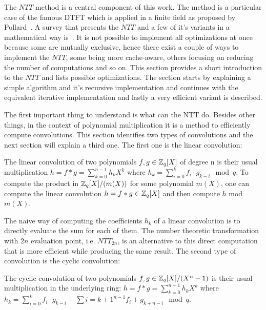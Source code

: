 The $NTT$ method is a central component of this work. The method is a particular case of the famous DTFT which is applied in a finite field as proposed by Pollard~\parencite{Pollard1971TheFF}. A survey that presents the $NTT$ and a few of it's variants in a mathematical way is~\parencite{liang2022number}. It is not possible to implement all optimizations at once because some are mutually exclusive, hence there exist a couple of ways to implement the $NTT$, some being more cache-aware, others focusing on reducing the number of computations and so on. This section provides a short introduction to the $NTT$ and lists possible optimizations. The section starts by explaining a simple algorithm and it's recursive implementation and continues with the equivalent iterative implementation and lastly a very efficient variant is described.

The first important thing to understand is what can the NTT do. Besides other things, in the context of polynomial multiplication it is a method to efficiently compute convolutions. This section identifies two types of convolutions and the next section will explain a third one. The first one is the linear convolution:

\begin{definition}
    The linear convolution of two polynomials $f, g \in \mathbb{Z}_q[X]$ of degree n is their usual multiplication $h = f * g = \sum_{k=0}^{n-1} h_k X^k$ where $h_k = \sum_{i=0}^k f_i \cdot g_{k-i} \mod q$. To compute the product in $\mathbb{Z}_q[X] / (m(X))$ for some polynomial $m(X)$, one can compute the linear convolution $h = f * g \in \mathbb{Z}_q[X]$ and then compute $h$ mod $m(X)$. 
\end{definition}

The naive way of computing the coefficients $h_k$ of a linear convolution is to directly evaluate the sum for each of them. The number theoretic transformation with $2n$ evaluation point, i.e. $NTT_{2n}$, is an alternative to this direct computation that is more efficient while producing the same result. The second type of convolution is the cyclic convolution:

\begin{definition}
    The cyclic convolution of two polynomials $f, g \in \mathbb{Z}_q[X]/(X^n - 1)$ is their usual multiplication in the underlying ring: $h = f * g = \sum_{k=0}^{n-1} h_k X^k$ where $h_k = \sum_{i=0}^k f_i \cdot g_{k-i} + \sum{i=k + 1}^{n-1} f_i + g_{k+n-i} \mod q$. 
\end{definition}

